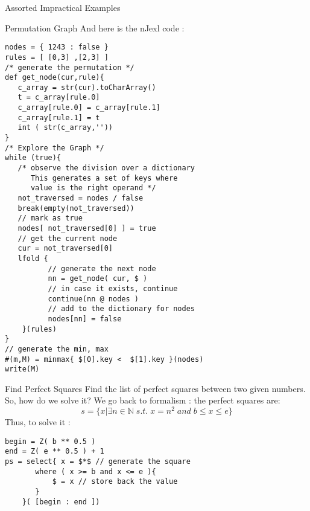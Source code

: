 \begin{section}{Assorted Impractical Examples}
\begin{subsection}{Permutation Graph}
And here is the nJexl code :
\begin{center}\begin{minipage}{\linewidth}
\begin{lstlisting}[style=JexlStyle]
nodes = { 1243 : false }
rules = [ [0,3] ,[2,3] ] 
/* generate the permutation */
def get_node(cur,rule){
   c_array = str(cur).toCharArray()
   t = c_array[rule.0]
   c_array[rule.0] = c_array[rule.1]
   c_array[rule.1] = t 
   int ( str(c_array,'')) 
}
/* Explore the Graph */
while (true){
   /* observe the division over a dictionary 
      This generates a set of keys where 
      value is the right operand */
   not_traversed = nodes / false 
   break(empty(not_traversed)) 
   // mark as true 
   nodes[ not_traversed[0] ] = true
   // get the current node 
   cur = not_traversed[0] 
   lfold {
          // generate the next node 
          nn = get_node( cur, $ )
          // in case it exists, continue 
          continue(nn @ nodes )
          // add to the dictionary for nodes 
          nodes[nn] = false 
    }(rules)
}
// generate the min, max 
#(m,M) = minmax{ $[0].key <  $[1].key }(nodes)
write(M)
\end{lstlisting}  
\end{minipage}\end{center}
\end{subsection}

\begin{subsection}{Find Perfect Squares}
Find the list of perfect squares between two given numbers.
So, how do we solve it? We go back to formalism : the perfect squares are:
$$
s = \{ x | \exists n \in \mathbb{N} \; s.t.\; x = n^2  \; and \;  b \le x \le e  \} 
$$
Thus, to solve it :
\begin{center}\begin{minipage}{\linewidth}
\begin{lstlisting}[style=JexlStyle]
begin = Z( b ** 0.5 )
end = Z( e ** 0.5 ) + 1 
ps = select{ x = $*$ // generate the square 
       where ( x >= b and x <= e ){
           $ = x // store back the value    
       } 
    }( [begin : end ])
\end{lstlisting}  
\end{minipage}\end{center}
\end{subsection}

\end{section}


